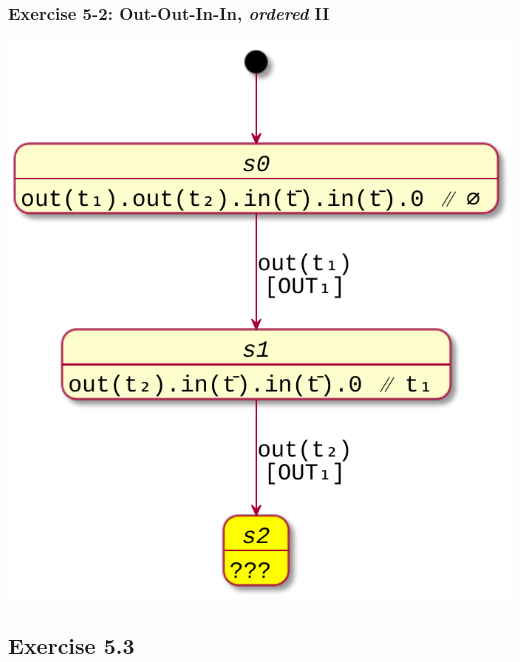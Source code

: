 \documentclass[handout]{beamer}\mode<presentation>{\usetheme{AMSCesenaBleu}}
\begin{document}
\begin{frame}
\frametitle{Exercise 5-2: Out-Out-In-In, \emph{ordered} II}

    \begin{center}
        \includegraphics[width=.5\linewidth]{res/img/out-out-in-in.pdf}
    \end{center}

\end{frame}

\subsection{Exercise 5.3}
\end{document}
